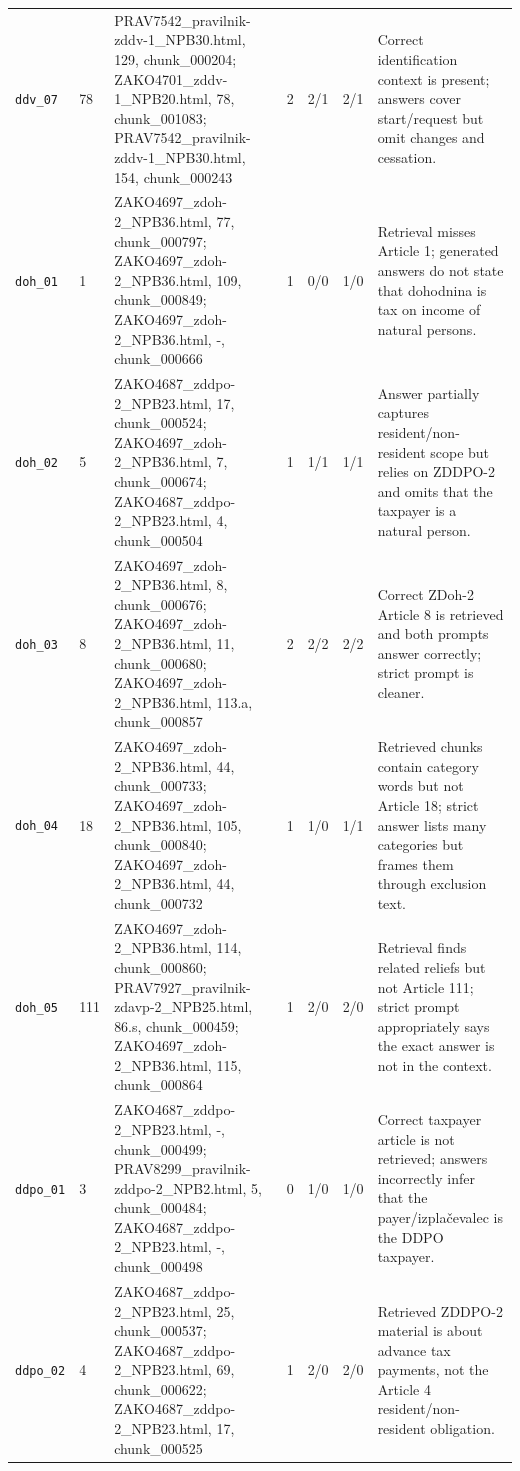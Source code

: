 \documentclass[11pt,a4paper]{article}
\begin{document}
\begin{landscape}
\begin{longtable}{p{1.7cm}p{1.2cm}p{6.0cm}p{1.3cm}p{1.4cm}p{1.4cm}p{6.0cm}}
\texttt{ddv\_07} & 78 & PRAV7542\_pravilnik-zddv-1\_NPB30.html, 129, chunk\_000204; ZAKO4701\_zddv-1\_NPB20.html, 78, chunk\_001083; PRAV7542\_pravilnik-zddv-1\_NPB30.html, 154, chunk\_000243 & 2 & 2/1 & 2/1 & Correct identification context is present; answers cover start/request but omit changes and cessation. \\
\texttt{doh\_01} & 1 & ZAKO4697\_zdoh-2\_NPB36.html, 77, chunk\_000797; ZAKO4697\_zdoh-2\_NPB36.html, 109, chunk\_000849; ZAKO4697\_zdoh-2\_NPB36.html, -, chunk\_000666 & 1 & 0/0 & 1/0 & Retrieval misses Article 1; generated answers do not state that dohodnina is tax on income of natural persons. \\
\texttt{doh\_02} & 5 & ZAKO4687\_zddpo-2\_NPB23.html, 17, chunk\_000524; ZAKO4697\_zdoh-2\_NPB36.html, 7, chunk\_000674; ZAKO4687\_zddpo-2\_NPB23.html, 4, chunk\_000504 & 1 & 1/1 & 1/1 & Answer partially captures resident/non-resident scope but relies on ZDDPO-2 and omits that the taxpayer is a natural person. \\
\texttt{doh\_03} & 8 & ZAKO4697\_zdoh-2\_NPB36.html, 8, chunk\_000676; ZAKO4697\_zdoh-2\_NPB36.html, 11, chunk\_000680; ZAKO4697\_zdoh-2\_NPB36.html, 113.a, chunk\_000857 & 2 & 2/2 & 2/2 & Correct ZDoh-2 Article 8 is retrieved and both prompts answer correctly; strict prompt is cleaner. \\
\texttt{doh\_04} & 18 & ZAKO4697\_zdoh-2\_NPB36.html, 44, chunk\_000733; ZAKO4697\_zdoh-2\_NPB36.html, 105, chunk\_000840; ZAKO4697\_zdoh-2\_NPB36.html, 44, chunk\_000732 & 1 & 1/0 & 1/1 & Retrieved chunks contain category words but not Article 18; strict answer lists many categories but frames them through exclusion text. \\
\texttt{doh\_05} & 111 & ZAKO4697\_zdoh-2\_NPB36.html, 114, chunk\_000860; PRAV7927\_pravilnik-zdavp-2\_NPB25.html, 86.s, chunk\_000459; ZAKO4697\_zdoh-2\_NPB36.html, 115, chunk\_000864 & 1 & 2/0 & 2/0 & Retrieval finds related reliefs but not Article 111; strict prompt appropriately says the exact answer is not in the context. \\
\texttt{ddpo\_01} & 3 & ZAKO4687\_zddpo-2\_NPB23.html, -, chunk\_000499; PRAV8299\_pravilnik-zddpo-2\_NPB2.html, 5, chunk\_000484; ZAKO4687\_zddpo-2\_NPB23.html, -, chunk\_000498 & 0 & 1/0 & 1/0 & Correct taxpayer article is not retrieved; answers incorrectly infer that the payer/izplačevalec is the DDPO taxpayer. \\
\texttt{ddpo\_02} & 4 & ZAKO4687\_zddpo-2\_NPB23.html, 25, chunk\_000537; ZAKO4687\_zddpo-2\_NPB23.html, 69, chunk\_000622; ZAKO4687\_zddpo-2\_NPB23.html, 17, chunk\_000525 & 1 & 2/0 & 2/0 & Retrieved ZDDPO-2 material is about advance tax payments, not the Article 4 resident/non-resident obligation. \\

\end{longtable}
\end{landscape}
\end{document}

